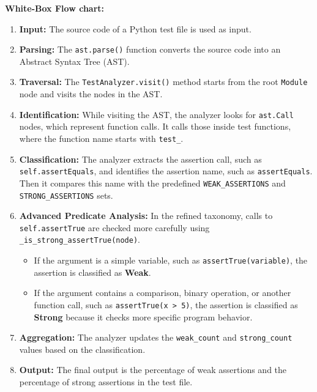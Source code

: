 \documentclass[conference]{IEEEtran}
\begin{document}
\textbf{White-Box Flow chart:}

\begin{enumerate}
    \item \textbf{Input:} The source code of a Python test file is used as input.

    \item \textbf{Parsing:} The \texttt{ast.parse()} function converts the source code into an Abstract Syntax Tree (AST).

    \item \textbf{Traversal:} The \texttt{TestAnalyzer.visit()} method starts from the root \texttt{Module} node and visits the nodes in the AST.

    \item \textbf{Identification:} While visiting the AST, the analyzer looks for \texttt{ast.Call} nodes, which represent function calls. It calls those inside test functions, where the function name starts with \texttt{test\_}.

    \item \textbf{Classification:} The analyzer extracts the assertion call, such as \texttt{self.assertEquals}, and identifies the assertion name, such as \texttt{assertEquals}. Then it compares this name with the predefined \texttt{WEAK\_ASSERTIONS} and \texttt{STRONG\_ASSERTIONS} sets.

    \item \textbf{Advanced Predicate Analysis:} In the refined taxonomy, calls to \texttt{self.assertTrue} are checked more carefully using \texttt{\_is\_strong\_assertTrue(node)}.
    \begin{itemize}
        \item If the argument is a simple variable, such as \texttt{assertTrue(variable)}, the assertion is classified as \textbf{Weak}.
        \item If the argument contains a comparison, binary operation, or another function call, such as \texttt{assertTrue(x > 5)}, the assertion is classified as \textbf{Strong} because it checks more specific program behavior.
    \end{itemize}

    \item \textbf{Aggregation:} The analyzer updates the \texttt{weak\_count} and \texttt{strong\_count} values based on the classification.

    \item \textbf{Output:} The final output is the percentage of weak assertions and the percentage of strong assertions in the test file.
\end{enumerate}
\end{document}
